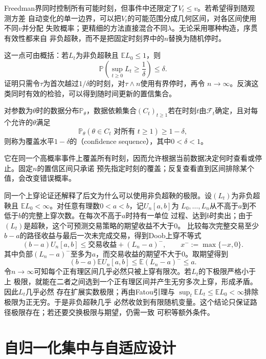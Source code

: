 Freedman界同时控制所有可能时刻，但事件中还限定了$V_t\leq v$。若希望得到随观测方差
自动变化的单一边界，可以把$V_t$的可能范围分成几何区间，对各区间使用不同$v$并分配
失败概率；更精细的方法直接混合不同$\lambda$。无论采用哪种构造，序贯有效性都来自
非负超鞅，而不是把固定时刻界中的$n$替换为随机停时。

这一点可由概括：若$L_t$为非负超鞅且
$\mathbb{E}L_0\leq1$，则
\begin{equation}
  \mathbb{P}\left(\sup_{t\geq0}L_t\geq\frac1\delta\right)
  \leq\delta.
  \label{eq:stoch-ville}
\end{equation}
证明只需令$\tau$为首次越过$1/\delta$的时刻，对$\tau\wedge n$使用有界停时，再令
$n\to\infty$。反演这类同时有效的检验，可以得到随时间更新的置信集合。
\begin{definition}[置信序列]
  \label{def:stoch-confidence-sequence}
  对参数为\(\theta\)时的数据分布\(\mathbb P_\theta\)，数据依赖集合\((C_t)_{t\geq1}\)若在时刻\(t\)由\(\mathcal F_t\)确定，且对每个允许的\(\theta\)满足
  \[ \mathbb P_\theta(\theta\in C_t\text{ 对所有 }t\geq1)\geq1-\delta, \]
  则称为覆盖水平\(1-\delta\)的（confidence sequence），其中\(0<\delta<1\)。
\end{definition}
它在同一个高概率事件上覆盖所有时刻，因而允许根据当前数据决定何时查看或停止。固定$n$的置信区间只承诺
预先指定时刻的覆盖；反复查看直到区间排除某个值，会改变错误概率。

同一个上穿论证还解释了后文为什么可以使用非负超鞅的极限。设$(L_t)$为非负超鞅且
$\mathbb{E}L_0<\infty$。对任意有理数$0<a<b$，记$U_n[a,b]$为
$L_0,\ldots,L_n$从不高于$a$到不低于$b$的完整上穿次数。在每次不高于$a$时持有一单位
过程、达到$b$时卖出；由于$(L_t)$是超鞅，这个可预测交易策略的期望收益不大于$0$。
比较每次完整交易至少$b-a$的路径收益与最后一次未完成交易，得到Doob上穿不等式
\[
  (b-a)U_n[a,b]
  \leq
  \text{交易收益}+(L_n-a)^-,
  \qquad x^-:=\max\{-x,0\}.
\]
其中负部$(L_n-a)^-$至多为$a$，而交易收益的期望不大于$0$。取期望得到
\[
  (b-a)\mathbb{E}U_n[a,b]
  \leq
  \mathbb{E}(L_n-a)^-
  \leq
  a.
\]
令$n\to\infty$可知每个正有理区间几乎必然只被上穿有限次。若$L_t$的下极限严格小于上
极限，就能在二者之间选到一个正有理区间并产生无穷多次上穿，形成矛盾。因此$L_t$几乎必然
存在扩展实数极限；再由Fatou引理与
$\sup_t\mathbb{E}L_t\leq\mathbb{E}L_0<\infty$排除极限为正无穷。于是非负超鞅几乎
必然收敛到有限随机变量。这个结论只保证路径极限存在；若还要交换极限与期望，仍需一致
可积等额外条件。

\section{自归一化集中与自适应设计}
\label{sec:stoch-self-normalized-adaptive-design}

